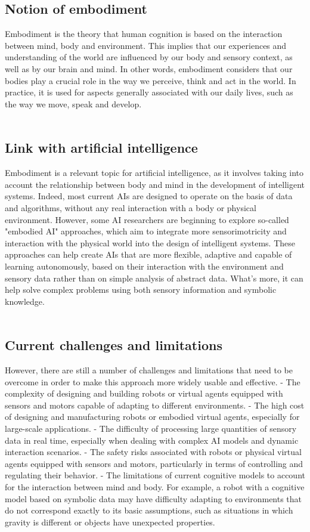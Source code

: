 \subsection{Notion of embodiment}
Embodiment is the theory that human cognition is based on the interaction between mind, body and environment. This implies that our experiences and understanding of the world are influenced by our body and sensory context, as well as by our brain and mind. In other words, embodiment considers that our bodies play a crucial role in the way we perceive, think and act in the world. In practice, it is used for aspects generally associated with our daily lives, such as the way we move, speak and develop.\\
\\
\subsection{Link with artificial intelligence}
Embodiment is a relevant topic for artificial intelligence, as it involves taking into account the relationship between body and mind in the development of intelligent systems. Indeed, most current AIs are designed to operate on the basis of data and algorithms, without any real interaction with a body or physical environment. However, some AI researchers are beginning to explore so-called "embodied AI" approaches, which aim to integrate more sensorimotricity and interaction with the physical world into the design of intelligent systems. These approaches can help create AIs that are more flexible, adaptive and capable of learning autonomously, based on their interaction with the environment and sensory data rather than on simple analysis of abstract data. What's more, it can help solve complex problems using both sensory information and symbolic knowledge.\\
\\
\subsection{Current challenges and limitations}
However, there are still a number of challenges and limitations that need to be overcome in order to make this approach more widely usable and effective.
- The complexity of designing and building robots or virtual agents equipped with sensors and motors capable of adapting to different environments.
- The high cost of designing and manufacturing robots or embodied virtual agents, especially for large-scale applications.
- The difficulty of processing large quantities of sensory data in real time, especially when dealing with complex AI models and dynamic interaction scenarios.
- The safety risks associated with robots or physical virtual agents equipped with sensors and motors, particularly in terms of controlling and regulating their behavior.
- The limitations of current cognitive models to account for the interaction between mind and body. For example, a robot with a cognitive model based on symbolic data may have difficulty adapting to environments that do not correspond exactly to its basic assumptions, such as situations in which gravity is different or objects have unexpected properties.
